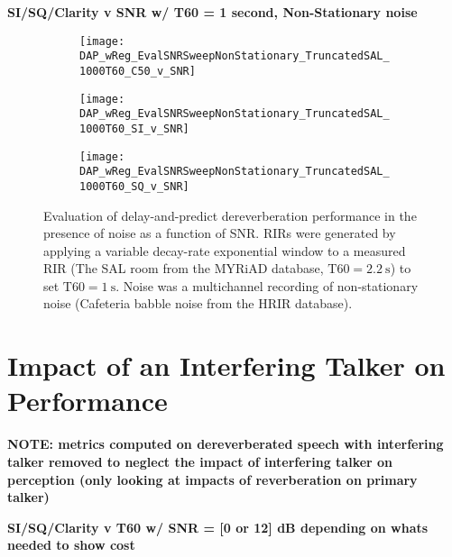 \textbf{SI/SQ/Clarity v SNR w/ T60 = 1 second, Non-Stationary noise}

\begin{figure}[H]
	\centering
	\begin{subfigure}[b]{0.47\textwidth}
		\centering
		\texttt{[image: DAP\_wReg\_EvalSNRSweepNonStationary\_TruncatedSAL\_1000T60\_C50\_v\_SNR]}
	\end{subfigure}
	\begin{subfigure}[b]{0.92\textwidth}
		\centering
		\texttt{[image: DAP\_wReg\_EvalSNRSweepNonStationary\_TruncatedSAL\_1000T60\_SI\_v\_SNR]}
	\end{subfigure}
	\begin{subfigure}[b]{0.92\textwidth}
		\centering
		\texttt{[image: DAP\_wReg\_EvalSNRSweepNonStationary\_TruncatedSAL\_1000T60\_SQ\_v\_SNR]}
	\end{subfigure}
	\caption{Evaluation of delay-and-predict dereverberation performance in the presence of noise as a function of SNR. RIRs were generated by applying a variable decay-rate exponential window to a measured RIR (The SAL room from the MYRiAD database, $\mathrm{T60} = \qty{2.2}{\second}$) to set $\mathrm{T60} = \qty{1}{\second}$. Noise was a multichannel recording of non-stationary noise (Cafeteria babble noise from the HRIR database).}
	\label{fig:DAP_wReg_EvalSNRSweepNonStationary_TruncatedSAL_1000T60}
\end{figure}
\section{Impact of an Interfering Talker on Performance}

\textbf{NOTE: metrics computed on dereverberated speech with interfering talker removed to  neglect the impact of interfering talker on perception (only looking at impacts of reverberation on primary talker)}

\textbf{SI/SQ/Clarity v T60 w/ SNR = [0 or 12] dB depending on whats needed to show cost}


